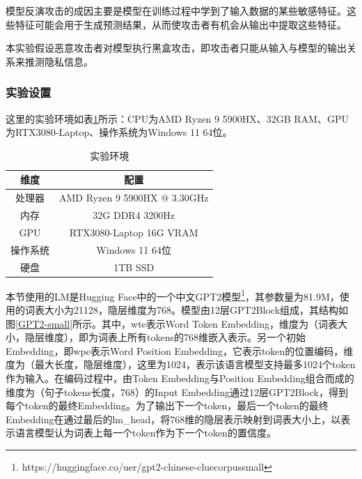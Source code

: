 模型反演攻击的成因主要是模型在训练过程中学到了输入数据的某些敏感特征。这些特征可能会用于生成预测结果，从而使攻击者有机会从输出中提取这些特征。

本实验假设恶意攻击者对模型执行黑盒攻击，即攻击者只能从输入与模型的输出关系来推测隐私信息。

\subsubsection{实验设置}

这里的实验环境如表\ref{chap3_exp1_env}所示：CPU为AMD Ryzen 9 5900HX、32GB RAM、GPU为RTX3080-Laptop、操作系统为Windows 11 64位。

\begin{table}[]
	\centering
	\caption{实验环境}
	\begin{tabular}{|c|c|}
		\hline
		维度&配置
		\\ \hline
		
		处理器&AMD Ryzen 9 5900HX @ 3.30GHz    \\ \hline
		内存&32G DDR4 3200Hz    \\ \hline
		GPU&RTX3080-Laptop 16G VRAM    \\ \hline
		操作系统&Windows 11 64位    \\ \hline
		硬盘&1TB SSD    \\ \hline
	\end{tabular}
	\label{chap3_exp1_env}
\end{table}


本节使用的LM是Hugging Face中的一个中文GPT2模型\footnote{https://huggingface.co/uer/gpt2-chinese-cluecorpussmall}，其参数量为81.9M，使用的词表大小为21128，隐层维度为768。模型由12层GPT2Block组成，其结构如图\ref{GPT2-small}所示。其中，wte表示Word Token Embedding，维度为（词表大小，隐层维度），即为词表上所有tokens的768维嵌入表示。另一个初始Embedding，即wpe表示Word Position Embedding，它表示token的位置编码，维度为（最大长度，隐层维度），这里为1024，表示该语言模型支持最多1024个token作为输入。在编码过程中，由Token Embedding与Position Embedding组合而成的维度为（句子tokens长度，768）的Input Embedding通过12层GPT2Block，得到每个token的最终Embedding。为了输出下一个token，最后一个token的最终Embedding在通过最后的lm\_head，将768维的隐层表示映射到词表大小上，以表示语言模型认为词表上每一个token作为下一个token的置信度。

